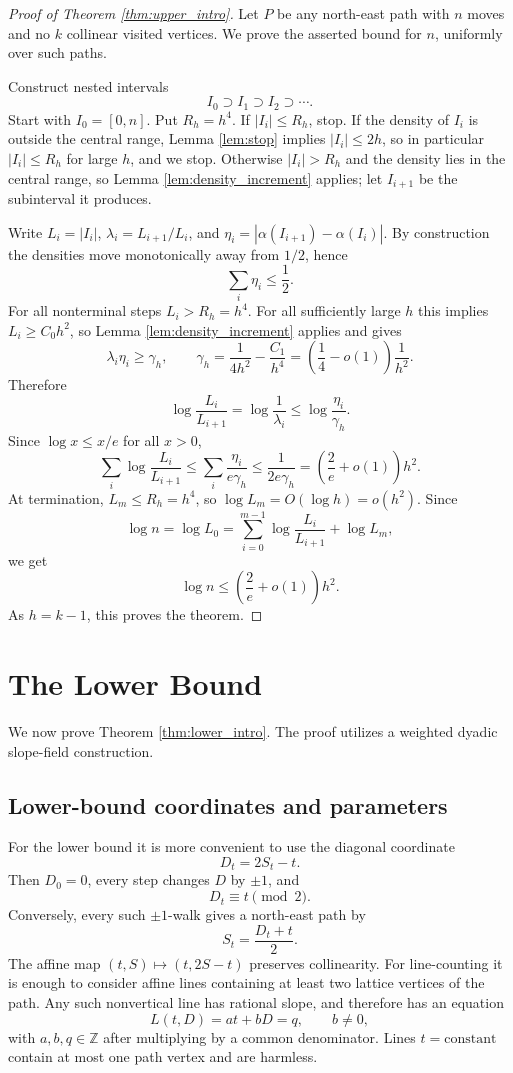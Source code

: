 \documentclass[10pt,a4paper]{amsart}
\newcommand{\Z}{\mathbb Z}
\newcommand{\1}{\mathbf 1}
\begin{document}
\begin{proof}[Proof of Theorem \ref{thm:upper_intro}]
Let $P$ be any north-east path with $n$ moves and no $k$ collinear visited vertices. We prove the asserted bound for $n$, uniformly over such paths.

\bigskip
\noindent
Construct nested intervals
\[
I_0\supset I_1\supset I_2\supset\cdots.
\]
Start with $I_0=[0,n]$. Put $R_h=h^4$. If $|I_i|\le R_h$, stop. If the density of $I_i$ is outside the central range, Lemma \ref{lem:stop} implies $|I_i|\le2h$, so in particular $|I_i|\le R_h$ for large $h$, and we stop. Otherwise $|I_i|>R_h$ and the density lies in the central range, so Lemma \ref{lem:density_increment} applies; let $I_{i+1}$ be the subinterval it produces.

\bigskip
\noindent
Write $L_i=|I_i|$, $\lambda_i=L_{i+1}/L_i$, and $\eta_i=|\alpha(I_{i+1})-\alpha(I_i)|$. By construction the densities move monotonically away from $1/2$, hence
\[
\sum_i\eta_i\le \frac12.
\]
For all nonterminal steps $L_i>R_h=h^4$.  For all sufficiently large $h$ this implies $L_i\ge C_0h^2$, so Lemma \ref{lem:density_increment} applies and gives
\[
\lambda_i\eta_i\ge \gamma_h,
\qquad
\gamma_h=\frac1{4h^2}-\frac{C_1}{h^4}
=\left(\frac14-o(1)\right)\frac1{h^2}.
\]
Therefore
\[
\log\frac{L_i}{L_{i+1}}=\log\frac1{\lambda_i}\le \log\frac{\eta_i}{\gamma_h}.
\]
Since $\log x\le x/e$ for all $x>0$,
\[
\sum_i\log\frac{L_i}{L_{i+1}}
\le \sum_i\frac{\eta_i}{e\gamma_h}
\le \frac{1}{2e\gamma_h}
=\left(\frac{2}{e}+o(1)\right)h^2.
\]
At termination, $L_m\le R_h=h^4$, so $\log L_m=O(\log h)=o(h^2)$. Since
\[
\log n=\log L_0=\sum_{i=0}^{m-1}\log\frac{L_i}{L_{i+1}}+\log L_m,
\]
we get
\[
\log n\le \left(\frac{2}{e}+o(1)\right)h^2.
\]
As $h=k-1$, this proves the theorem.
\end{proof}

\section{The Lower Bound}\label{sec:dyadic_lower}

We now prove Theorem \ref{thm:lower_intro}.  The proof utilizes a weighted dyadic slope-field construction.

\subsection{Lower-bound coordinates and parameters}

For the lower bound it is more convenient to use the diagonal coordinate
\[
D_t=2S_t-t.
\]
Then $D_0=0$, every step changes $D$ by $\pm1$, and
\[
D_t\equiv t\pmod 2.
\]
Conversely, every such $\pm1$-walk gives a north-east path by
\[
S_t=\frac{D_t+t}{2}.
\]
The affine map $(t,S)\mapsto(t,2S-t)$ preserves collinearity.  For line-counting it is enough to consider affine lines containing at least two
lattice vertices of the path.  Any such nonvertical line has rational slope, and therefore has an equation
\[
L(t,D)=at+bD=q,
\qquad b\ne0,
\]
with $a,b,q\in\Z$ after multiplying by a common denominator.  Lines $t=\text{constant}$ contain at most one path vertex and are harmless.
\end{document}
